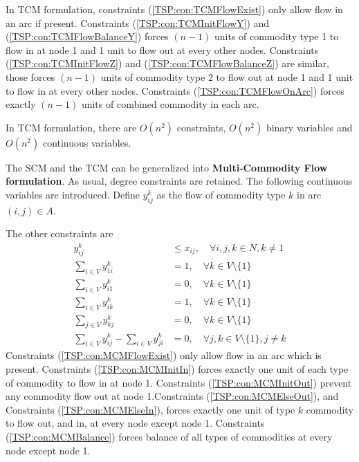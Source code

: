 					In TCM formulation, constraints (\ref{TSP:con:TCMFlowExist}) only allow flow in an arc if present. Constraints (\ref{TSP:con:TCMInitFlowY}) and (\ref{TSP:con:TCMFlowBalanceY}) forces $(n - 1)$ units of commodity type 1 to flow in at node 1 and 1 unit to flow out at every other nodes. Constraints (\ref{TSP:con:TCMInitFlowZ}) and (\ref{TSP:con:TCMFlowBalanceZ}) are similar, those forces $(n - 1)$ units of commodity type 2 to flow out at node 1 and 1 unit to flow in at every other nodes. Constraints (\ref{TSP:con:TCMFlowOnArc}) forces exactly $(n - 1)$ units of combined commodity in each arc.

					In TCM formulation, there are $O(n^2)$ constraints, $O(n^2)$ binary variables and $O(n^2)$ continuous variables.

					The SCM and the TCM can be generalized into \textbf{Multi-Commodity Flow formulation}. As usual, degree constraints are retained. The following continuous variables are introduced. Define $y_{ij}^k$ as the flow of commodity type $k$ in arc $(i, j) \in A$.

					The other constraints are
					\begin{align}
						y_{ij}^k &\le x_{ij}, \quad \forall i, j, k \in N, k \neq 1 \label{TSP:con:MCMFlowExist}\\
						\sum_{i \in V} y_{1i}^k &= 1, \quad \forall k \in V \setminus \{1\} \label{TSP:con:MCMInitIn}\\
						\sum_{i \in V} y_{i1}^k &= 0, \quad \forall k \in V \setminus \{1\} \label{TSP:con:MCMInitOut}\\
						\sum_{i \in V} y_{ik}^k &= 1, \quad \forall k \in V \setminus \{1\} \label{TSP:con:MCMElseOut}\\
						\sum_{j \in V} y_{kj}^k &= 0, \quad \forall k \in V \setminus \{1\} \label{TSP:con:MCMElseIn}\\
						\sum_{i \in V} y_{ij}^k - \sum_{i \in V} y_{ji}^k &= 0, \quad \forall j, k \in V \setminus \{1\}, j \neq k \label{TSP:con:MCMBalance}
					\end{align}
					Constraints (\ref{TSP:con:MCMFlowExist}) only allow flow in an arc which is present. Constraints (\ref{TSP:con:MCMInitIn}) forces exactly one unit of each type of commodity to flow in at node 1. Constraints (\ref{TSP:con:MCMInitOut}) prevent any commodity flow out at node 1.Constraints (\ref{TSP:con:MCMElseOut}), and Constraints (\ref{TSP:con:MCMElseIn}), forces exactly one unit of type $k$ commodity to flow out, and in, at every node except node 1. Constraints (\ref{TSP:con:MCMBalance}) forces balance of all types of commodities at every node except node 1.

